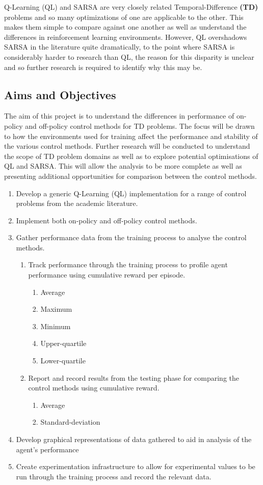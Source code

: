 \documentclass[hidelinks,journal]{IEEEtran}
\begin{document}
Q-Learning (QL) and SARSA are very closely related Temporal-Difference \textbf{(TD)} problems and so many optimizations of one are applicable to the other. This makes them simple to compare against one another as well as understand the differences in reinforcement learning environments. However, QL overshadows SARSA in the literature quite dramatically, to the point where SARSA is considerably harder to research than QL, the reason for this disparity is unclear and so further research is required to identify why this may be.
\subsection{Aims and Objectives}
\label{subsec:intAimAndObj}
The aim of this project is to understand the differences in performance of on-policy and off-policy control methods for TD problems. The focus will be drawn to how the environments used for training affect the performance and stability of the various control methods. Further research will be conducted to understand the scope of TD problem domains as well as to explore potential optimisations of QL and SARSA. This will allow the analysis to be more complete as well as presenting additional opportunities for comparison between the control methods.
\begin{enumerate}
  \item Develop a generic Q-Learning (QL) implementation for a range of control problems from the academic literature.
  \item Implement both on-policy and off-policy control methods.
  \item Gather performance data from the training process to analyse the control methods.
  \begin{enumerate}
    \item Track performance through the training process to profile agent performance using cumulative reward per episode.
    \begin{enumerate}
      \item Average
      \item Maximum
      \item Minimum
      \item Upper-quartile
      \item Lower-quartile
    \end{enumerate}
    \item Report and record results from the testing phase for comparing the control methods using cumulative reward.
    \begin{enumerate}
      \item Average
      \item Standard-deviation
    \end{enumerate}
  \end{enumerate}
  \item Develop graphical representations of data gathered to aid in analysis of the agent’s performance
  \item Create experimentation infrastructure to allow for experimental values to be run through the training process and record the relevant data.
\end{enumerate}
\end{document}
